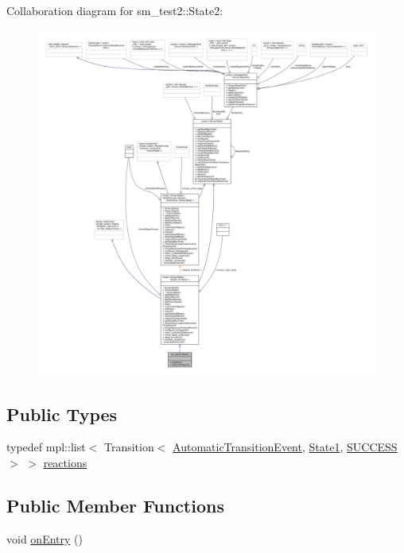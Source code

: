 Collaboration diagram for sm\+\_\+test2\+:\+:State2\+:
\nopagebreak
\begin{figure}[H]
\begin{center}
\leavevmode
\includegraphics[width=350pt]{structsm__test2_1_1State2__coll__graph}
\end{center}
\end{figure}
\subsection*{Public Types}
\begin{DoxyCompactItemize}
\item 
typedef mpl\+::list$<$ Transition$<$ \hyperlink{structsm__test2_1_1AutomaticTransitionEvent}{Automatic\+Transition\+Event}, \hyperlink{structsm__test2_1_1State1}{State1}, \hyperlink{classSUCCESS}{S\+U\+C\+C\+E\+SS} $>$ $>$ \hyperlink{structsm__test2_1_1State2_ac0be669416dfba18151af79b1eb2b1de}{reactions}
\end{DoxyCompactItemize}
\subsection*{Public Member Functions}
\begin{DoxyCompactItemize}
\item 
void \hyperlink{structsm__test2_1_1State2_aac555da5724e95296482d06026bbca88}{on\+Entry} ()
\end{DoxyCompactItemize}
